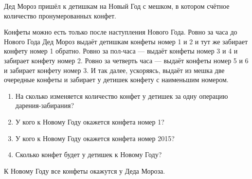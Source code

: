 \begin{problem}
Дед Мороз пришёл к детишкам на Новый Год с мешком, 
в котором счётное количество пронумерованных конфет. 

Конфеты можно есть только после наступления Нового Года. 
Ровно за часа до Нового Года Дед Мороз выдаёт детишкам конфеты номер 1 и 2 и тут же забирает конфету номер 1 обратно. 
Ровно за пол-часа — выдаёт конфеты номер 3 и 4 и забирает конфету номер 2. 
Ровно за четверть часа — выдаёт конфеты номер 5 и 6 и забирает конфету номер 3. 
И так далее, ускоряясь, выдаёт из мешка две очередные конфеты и забирает у детишек конфету с наименьшим номером.

\begin{enumerate}
\item На сколько изменяется количество конфет у детишек за одну операцию дарения-забирания?
\item У кого к Новому Году окажется конфета номер 1?
\item У кого к Новому Году окажется конфета номер 2015?
\item Сколько конфет будет у детишек к Новому Году?
\end{enumerate}


\begin{sol}
К Новому Году все конфеты окажутся у Деда Мороза.
\end{sol}
\end{problem}


